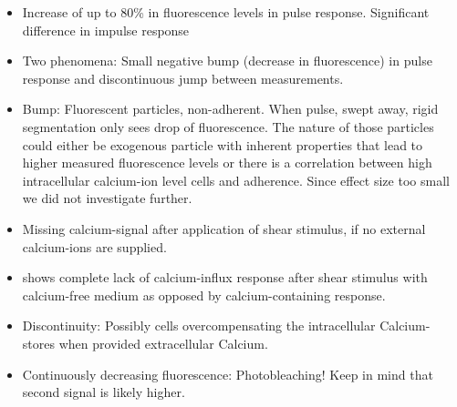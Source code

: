 \begin{itemize}

    \item Increase of up to 80\% in fluorescence levels in pulse response. Significant difference in impulse response

    \item Two phenomena: Small negative bump (decrease in fluorescence) in pulse response and discontinuous jump between measurements.
    \item Bump: Fluorescent particles, non-adherent. When pulse, swept away, rigid segmentation only sees drop of fluorescence. The nature of those particles could either be exogenous particle with inherent properties that lead to higher measured fluorescence levels or there is a correlation between high intracellular calcium-ion level cells and adherence. Since effect size too small we did not investigate further.
    \item Missing calcium-signal after application of shear stimulus, if no external calcium-ions are supplied. 
    \item shows complete lack of calcium-influx response after shear stimulus with calcium-free medium as opposed by calcium-containing response. 
    \item Discontinuity: Possibly cells overcompensating the intracellular Calcium-stores when provided extracellular Calcium.
    \item Continuously decreasing fluorescence: Photobleaching! Keep in mind that second signal is likely higher.
    
\end{itemize}

